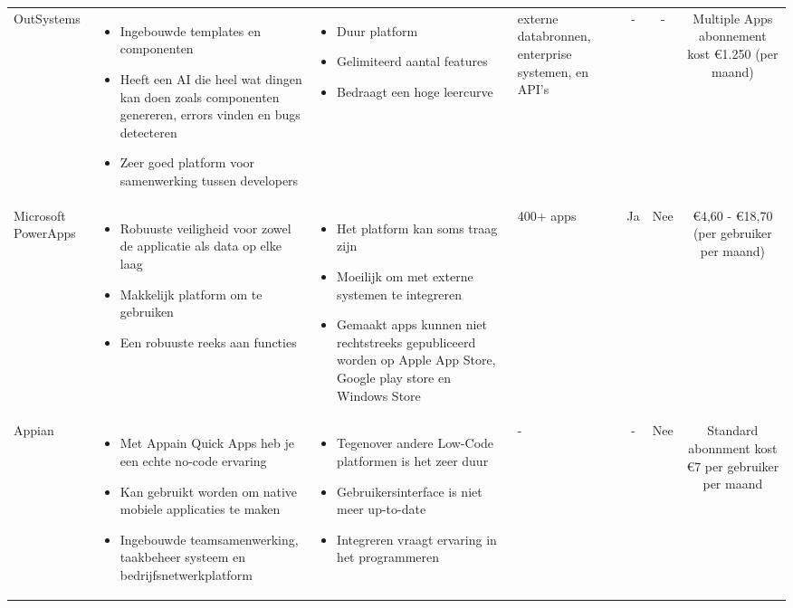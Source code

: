 \begin{longtable}{p{2.2cm} p{2.4cm} p{2.4cm} p{2.2cm} c c c}
    OutSystems & 
    \begin{itemize}
        \item Ingebouwde templates en componenten
        \item Heeft een AI die heel wat dingen kan doen zoals componenten genereren, errors vinden en bugs detecteren 
        \item Zeer goed platform voor samenwerking tussen developers
    \end{itemize} & 
    \begin{itemize}
        \item  Duur platform
        \item  Gelimiteerd aantal features
        \item  Bedraagt een hoge leercurve
    \end{itemize} &
    externe databronnen, enterprise systemen, en API's &
    - &
    - &
    Multiple Apps abonnement kost €1.250 (per maand)\\

    Microsoft PowerApps & 
    \begin{itemize}
        \item Robuuste veiligheid voor zowel de applicatie als data op elke laag
        \item Makkelijk platform om te gebruiken
        \item Een robuuste reeks aan functies
    \end{itemize} & 
    \begin{itemize}
        \item Het platform kan soms traag zijn
        \item Moeilijk om met externe systemen te integreren
        \item Gemaakt apps kunnen niet rechtstreeks gepubliceerd worden op Apple App Store, Google play store en Windows Store
    \end{itemize} &
    400+ apps &
    Ja &
    Nee &
    €4,60 - €18,70 (per gebruiker per maand)\\


    Appian & 
    \begin{itemize}
        \item Met Appain Quick Apps heb je een echte no-code ervaring
        \item Kan gebruikt worden om native mobiele applicaties te maken
        \item Ingebouwde teamsamenwerking, taakbeheer systeem en bedrijfsnetwerkplatform
    \end{itemize} & 
    \begin{itemize}
        \item Tegenover andere Low-Code platformen is het zeer duur
        \item Gebruikersinterface is niet meer up-to-date 
        \item Integreren vraagt ervaring in het programmeren
    \end{itemize} &
    - &
    - &
    Nee &
    Standard abonnment kost €7 per gebruiker per maand\\


\end{longtable}
